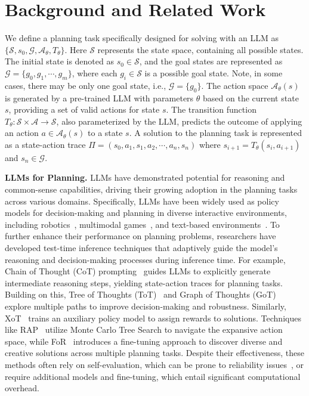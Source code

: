 \section{Background and Related Work}
We define a planning task specifically designed for solving with an LLM as $\{\mathcal{S}, s_0, \mathcal{G}, \mathcal{A}_\theta, T_\theta\}$. Here $\mathcal{S}$ represents the state space, containing all possible states. The initial state is denoted as $s_0 \in \mathcal{S}$, and the goal states are represented as $\mathcal{G} = \{ g_0,g_1, \cdots, g_m\}$, where each $g_i \in \mathcal{S}$ is a possible goal state. Note, in some cases, there may be only one goal state, i.e., $\mathcal{G} = \{ g_0\}$. The action space $\mathcal{A}_\theta(s)$ is generated by a pre-trained LLM with parameters $\theta$ based on the current state $s$, providing a set of valid actions for state $s$. The transition function $T_\theta : \mathcal{S} \times \mathcal{A} \rightarrow \mathcal{S}$, also parameterized by the LLM, predicts the outcome of applying an action $a \in \mathcal{A}_\theta(s)$ to a state $s$.  A solution to the planning task is represented as a state-action trace $\Pi = (s_0, a_1, s_1, a_2, \cdots, a_n,s_n )$ where $s_{i+1} = T_\theta(s_i, a_{i+1})$ and $s_n \in \mathcal{G}$.

\textbf{LLMs for Planning.} 
LLMs have demonstrated potential for reasoning and common-sense capabilities, driving their growing adoption in the planning tasks across various domains. Specifically, LLMs have been widely used as policy models for decision-making and planning in diverse interactive environments, including robotics~\citep{driess2023palm,huang2022inner,kannan2024smart,singh2023progprompt}, multimodal games~\citep{fan2022minedojo,wang2023voyager}, and text-based environments~\citep{liu2023agentbench,yao2022react,shinn2024reflexion}. To further enhance their performance on planning problems, researchers have developed test-time inference techniques that adaptively guide the model's reasoning and decision-making processes during inference time. For example, Chain of Thought (CoT) prompting~\citep{wei2022chain} guides LLMs to explicitly generate intermediate reasoning steps, yielding state-action traces for planning tasks. Building on this, Tree of Thoughts (ToT)~\citep{yao2024tree} and Graph of Thoughts (GoT)~\citep{besta2024graph} explore multiple paths to improve decision-making and robustness. Similarly, XoT~\citep{ding2023everything} trains an auxiliary policy model to assign rewards to solutions. Techniques like RAP~\citep{hao2023reasoning} utilize Monte Carlo Tree Search to navigate the expansive action space, while FoR~\citep{yu2024flow} introduces a fine-tuning approach to discover diverse and creative solutions across multiple planning tasks. Despite their effectiveness, these methods often rely on self-evaluation, which can be prone to reliability issues~\citep{huang2023large, stechly2024self}, or require additional models and fine-tuning, which entail significant computational overhead.

